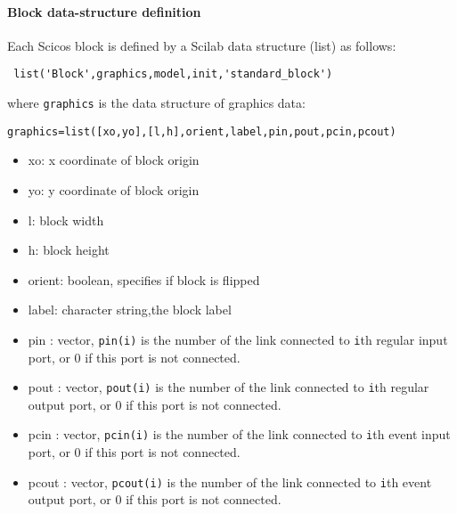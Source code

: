 \paragraph{Block data-structure definition}
\label{bds}
Each Scicos   block is defined by a Scilab data structure (list) as
follows:
\begin{verbatim}
 list('Block',graphics,model,init,'standard_block')
\end{verbatim}
where {\tt graphics} is the data structure of graphics data:
\begin{verbatim}
graphics=list([xo,yo],[l,h],orient,label,pin,pout,pcin,pcout)
\end{verbatim}
\begin{itemize}
\item xo: x coordinate of block origin
\item yo: y coordinate of block origin
\item l: block width
\item h: block height
\item orient:  boolean, specifies if block is flipped
\item label: character string,the block label
\item pin  : vector, {\tt pin(i)} is  the number  of the link
  connected to {\tt i}th regular input port, or 0 if this port is not  connected.
\item pout  : vector, {\tt pout(i)} is  the number  of the link
  connected to {\tt i}th regular output port, or 0 if this port is not
  connected.
\item pcin  : vector, {\tt pcin(i)} is  the number  of the link
  connected to {\tt i}th event input port, or 0 if this port is not
  connected.
\item pcout  : vector, {\tt pcout(i)} is  the number  of the link
  connected to {\tt i}th event output port, or 0 if this port is not
  connected.
\end{itemize}

